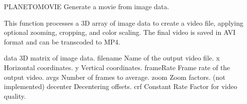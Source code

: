 \documentclass[letterpaper,10pt,english]{sphinxmanual}
\begin{document}

\begin{fulllineitems}
\label{\detokenize{api/utils:planeToMovie}}
\pysigstartsignatures
{}
\pysigstopsignatures
\sphinxAtStartPar
PLANETOMOVIE Generate a movie from image data.

\sphinxAtStartPar
This function processes a 3D array of image data to create a video file,
applying optional zooming, cropping, and color scaling. The final video is
saved in AVI format and can be transcoded to MP4.
\begin{description}
\sphinxAtStartPar
data \sphinxhyphen{} 3D matrix of image data.
filename \sphinxhyphen{} Name of the output video file.
x \sphinxhyphen{} Horizontal coordinates.
y \sphinxhyphen{} Vertical coordinates.
frameRate \sphinxhyphen{} Frame rate of the output video.
avgs \sphinxhyphen{} Number of frames to average.
zoom \sphinxhyphen{} Zoom factors. (not implemented)
decenter \sphinxhyphen{} Decentering offsets.
crf \sphinxhyphen{} Constant Rate Factor for video quality.

\end{description}

\end{fulllineitems}

\end{document}

